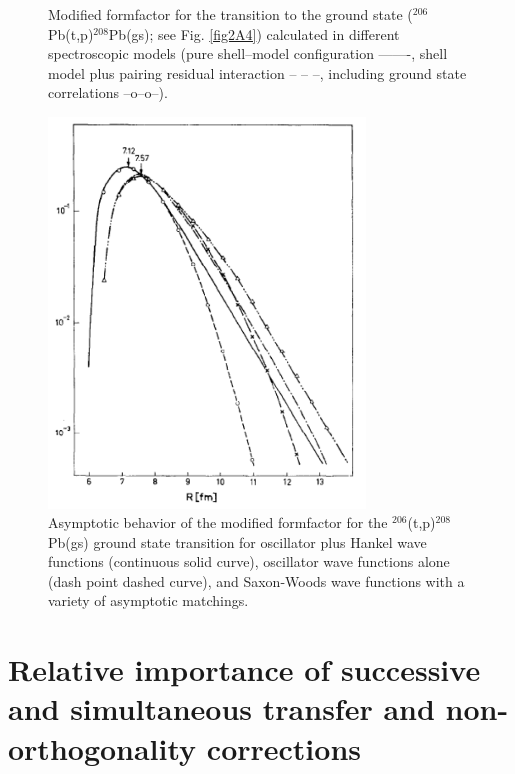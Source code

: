 \begin{subappendices}
\begin{figure}[h!]
\begin{center}
\end{center}\caption{Modified formfactor for the transition to the ground state ($^{206}$Pb(t,p)$^{208}$Pb(gs); see Fig. \ref{fig2A4}) calculated in different spectroscopic models (pure shell--model configuration -------, shell model  plus pairing residual interaction -- -- --, including ground state correlations --o--o--).}\label{figC7B3}
\end{figure}
 \begin{figure}[h!]
 	\begin{center}
\includegraphics*[width=0.75\textwidth]{C7/figs_C7/figC7B4}
\end{center}\caption{Asymptotic behavior of the modified formfactor for the $^{206}$(t,p)$^{208}$Pb(gs) ground state transition for oscillator plus Hankel wave functions (continuous solid curve), oscillator wave functions alone (dash point dashed curve), and Saxon-Woods wave functions with a variety of asymptotic matchings.}\label{figC7B4}
\end{figure}
\section[Successive, simultaneous, non--orthogonality]{Relative importance of successive and simultaneous transfer and non-orthogonality corrections}\label{C7AppC}


\end{subappendices}

